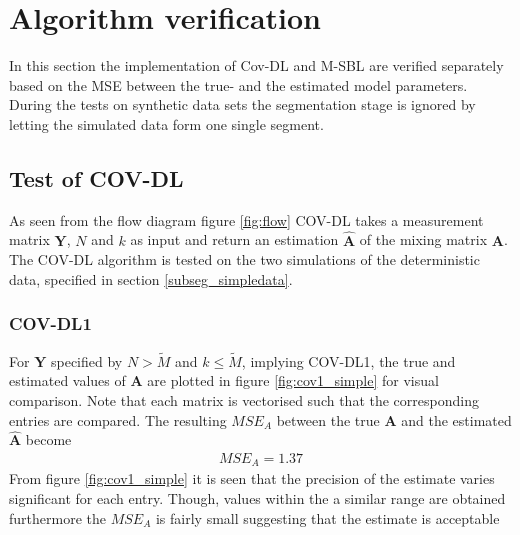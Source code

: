 \section{Algorithm verification}
In this section the implementation of Cov-DL and M-SBL are verified separately based on the MSE between the true- and the estimated model parameters.
During the tests on synthetic data sets the segmentation stage is ignored by letting the simulated data form one single segment.    

\subsection{Test of COV-DL}
As seen from the flow diagram figure \ref{fig:flow} COV-DL takes a measurement matrix $\textbf{Y}$, $N$ and $k$ as input and return an estimation $\hat{\textbf{A}}$ of the mixing matrix $\textbf{A}$. The COV-DL algorithm is tested on the two simulations of the deterministic data, specified in section \ref{subseg_simpledata}. 

\subsubsection{COV-DL1}
For $\textbf{Y}$ specified by $N > \widetilde{M}$ and $k\leq \widetilde{M}$, implying COV-DL1, the true and estimated values of $\textbf{A}$ are plotted in figure \ref{fig:cov1_simple} for visual comparison. Note that each matrix is vectorised such that the corresponding entries are compared.  
The resulting $MSE_{A}$ between the true $\textbf{A}$ and the estimated $\hat{\textbf{A}}$ become 
\begin{align*}
MSE_{A} = 1.37
\end{align*}
From figure \ref{fig:cov1_simple} it is seen that the precision of the estimate varies significant for each entry. Though, values within the a similar range are obtained furthermore the $MSE_{A}$ is fairly small suggesting that the estimate is acceptable  

